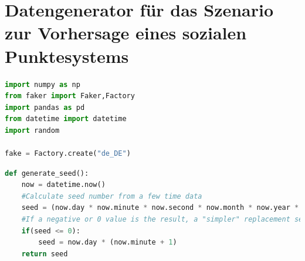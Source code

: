 \documentclass[a4paper,12pt]{report}
\begin{document}
    \chapter{Datengenerator für das Szenario zur Vorhersage eines sozialen Punktesystems}
\begin{lstlisting}[language=Python,label={lst:Sz2Z1},caption=Erste Zelle für das Laden der Bibliotheken]
import numpy as np
from faker import Faker,Factory
import pandas as pd
from datetime import datetime
import random

fake = Factory.create("de_DE")
\end{lstlisting}
\begin{lstlisting}[language=Python,label={lst:Sz2Z2},caption=Zweite Zelle für das Generieren eines zeitabhängigen Seed]
def generate_seed():
    now = datetime.now()
    #Calculate seed number from a few time data
    seed = (now.day * now.minute * now.second * now.month * now.year * now.hour) / now.microsecond 
    #If a negative or 0 value is the result, a "simpler" replacement seed is generated. 
    if(seed <= 0):
        seed = now.day * (now.minute + 1)
    return seed
\end{lstlisting}
\end{document}
